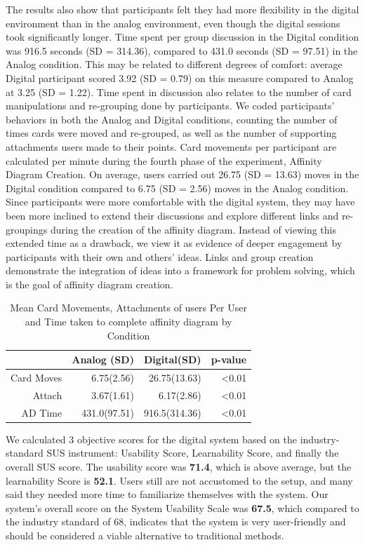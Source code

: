 \documentclass{sigchi}
\begin{document}
The results also show that participants felt they had more flexibility in the digital environment than in the analog environment, even though the digital sessions took significantly longer. Time spent per group discussion in the Digital condition was 916.5 seconds (SD = 314.36), compared to 431.0 seconds (SD = 97.51) in the Analog condition. This may be related to different degrees of comfort: average Digital participant scored 3.92 (SD = 0.79) on this measure compared to Analog at 3.25 (SD = 1.22). Time spent in discussion also relates to the number of card manipulations and re-grouping done by participants. We coded participants' behaviors in both the Analog and Digital conditions, counting the number of times cards were moved and re-grouped, as well as the number of supporting attachments users made to their points. Card movements per participant are calculated per minute during the fourth phase of the experiment, Affinity Diagram Creation. On average, users carried out 26.75 (SD = 13.63) moves in the Digital condition compared to 6.75 (SD = 2.56) moves in the Analog condition. Since participants were more comfortable with the digital system, they may have been more inclined to extend their discussions and explore different links and re-groupings during the creation of the affinity diagram. Instead of viewing this extended time as a drawback, we view it as evidence of deeper engagement by participants with their own and others' ideas. Links and group creation demonstrate the integration of ideas into a framework for problem solving, which is the goal of affinity diagram creation. 

\begin{table}[ht]
\centering
\caption{Mean Card Movements, Attachments of users Per User and Time taken to complete affinity diagram by Condition}

\begin{tabular}{rrrr}
  \hline
& Analog (SD) & Digital(SD) & p-value \\ 
  \hline
  \hline
Card Moves  &    6.75(2.56)& 26.75(13.63)   &  \textless0.01    \\
Attach & 3.67(1.61)  &    6.17(2.86)    &  \textless0.01    \\
AD Time  &    431.0(97.51)   &      916.5(314.36)      &   \textless0.01    \\ 
\hline
\end{tabular}
\end{table}



We calculated 3 objective scores for the digital system based on the industry-standard SUS instrument: Usability Score, Learnability Score, and finally the overall SUS score. The usability score was \textbf{71.4}, which is above average, but the learnability Score is \textbf{52.1}. Users still are not accustomed to the setup, and many said they needed more time to familiarize themselves with the system. Our system's overall score on the System Usability Scale was \textbf{67.5}, which compared to the industry standard of 68, indicates that the system is very user-friendly and should be considered a viable alternative to traditional methods. 
\end{document}
